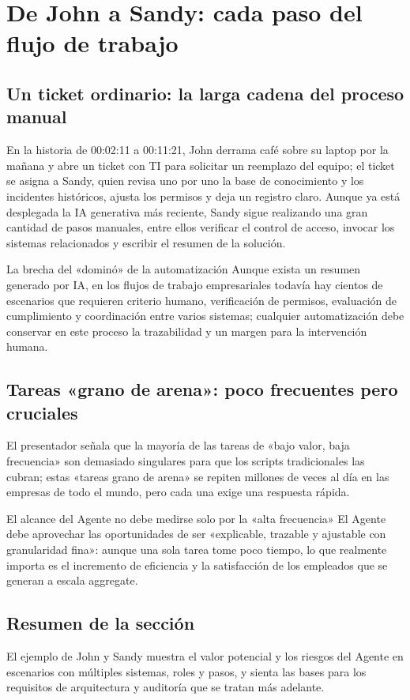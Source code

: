 \section{De John a Sandy: cada paso del flujo de trabajo}
\subsection{Un ticket ordinario: la larga cadena del proceso manual}
En la historia de 00:02:11 a 00:11:21, John derrama café sobre su laptop por la mañana y abre un ticket con TI para solicitar un reemplazo del equipo; el ticket se asigna a Sandy, quien revisa uno por uno la base de conocimiento y los incidentes históricos, ajusta los permisos y deja un registro claro. Aunque ya está desplegada la IA generativa más reciente, Sandy sigue realizando una gran cantidad de pasos manuales, entre ellos verificar el control de acceso, invocar los sistemas relacionados y escribir el resumen de la solución.

\begin{warningbox}{La brecha del «dominó» de la automatización}
Aunque exista un resumen generado por IA, en los flujos de trabajo empresariales todavía hay cientos de escenarios que requieren criterio humano, verificación de permisos, evaluación de cumplimiento y coordinación entre varios sistemas; cualquier automatización debe conservar en este proceso la trazabilidad y un margen para la intervención humana.
\end{warningbox}

\subsection{Tareas «grano de arena»: poco frecuentes pero cruciales}
El presentador señala que la mayoría de las tareas de «bajo valor, baja frecuencia» son demasiado singulares para que los scripts tradicionales las cubran; estas «tareas grano de arena» se repiten millones de veces al día en las empresas de todo el mundo, pero cada una exige una respuesta rápida.

\begin{importantbox}{El alcance del Agente no debe medirse solo por la «alta frecuencia»
}
El Agente debe aprovechar las oportunidades de ser «explicable, trazable y ajustable con granularidad fina»: aunque una sola tarea tome poco tiempo, lo que realmente importa es el incremento de eficiencia y la satisfacción de los empleados que se generan a escala aggregate.
\end{importantbox}

\subsection{Resumen de la sección}
El ejemplo de John y Sandy muestra el valor potencial y los riesgos del Agente en escenarios con múltiples sistemas, roles y pasos, y sienta las bases para los requisitos de arquitectura y auditoría que se tratan más adelante.
